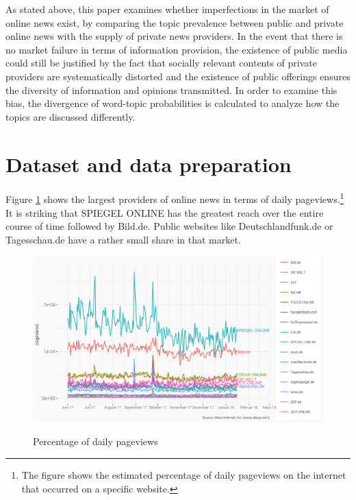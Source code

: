 \documentclass[12pt,a4paper,notitlepage]{article}
\begin{document}
As stated above, this paper examines whether imperfections in the market of online news exist, by comparing the topic prevalence between public and private online news with the supply of private news providers. In the event that there is no market failure in terms of information provision, the existence of public media could still be justified by the fact that socially relevant contents of private providers are systematically distorted and the existence of public offerings ensures the diversity of information and opinions transmitted. In order to examine this bias, the divergence of word-topic probabilities is calculated to analyze how the topics are discussed differently.

\section{Dataset and data preparation}\label{ch_data}

Figure \ref{fig_reach} shows the largest providers of online news in terms of daily pageviews.\footnote{The figure shows the estimated percentage of daily pageviews on the internet that occurred on a specific website.} It is striking that SPIEGEL ONLINE has the greatest reach over the entire course of time followed by Bild.de. Public websites like Deutschlandfunk.de or Tagesschau.de have a rather small share in that market. 

\begin{figure}[H]
	\caption{Percentage of daily pageviews}
	\includegraphics[width=\textwidth]{../figs/reach.png}
	\label{fig_reach}
\end{figure}
\end{document}
